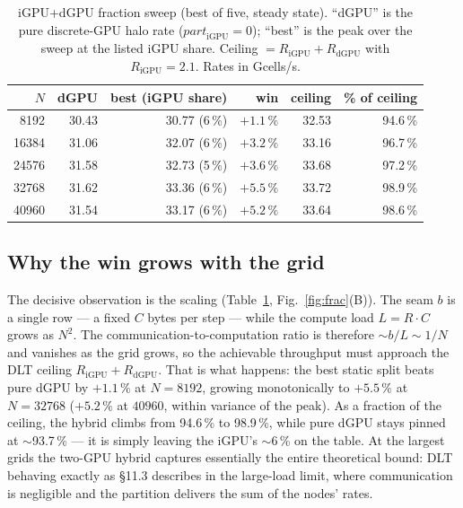 \documentclass[
	english,
	letterpaper, oneside
]{article}
\begin{document}
\begin{table}[H]
	\centering
	\caption{iGPU+dGPU fraction sweep (best of five, steady state). ``dGPU'' is the
	pure discrete-GPU halo rate ($\mathit{part}_\text{iGPU}=0$); ``best'' is the peak
	over the sweep at the listed iGPU share. Ceiling $=R_\text{iGPU}+R_\text{dGPU}$
	with $R_\text{iGPU}=2.1$. Rates in Gcells/s.}
	\label{tab:frac}
	\begin{tabular}{@{}rrrrrr@{}}
		\toprule
		$N$ & dGPU & best (iGPU share) & win & ceiling & \% of ceiling \\
		\midrule
		8192  & 30.43 & 30.77 (6\,\%) & $+1.1\,\%$ & 32.53 & 94.6\,\% \\
		16384 & 31.06 & 32.07 (6\,\%) & $+3.2\,\%$ & 33.16 & 96.7\,\% \\
		24576 & 31.58 & 32.73 (5\,\%) & $+3.6\,\%$ & 33.68 & 97.2\,\% \\
		32768 & 31.62 & 33.36 (6\,\%) & $+5.5\,\%$ & 33.72 & 98.9\,\% \\
		40960 & 31.54 & 33.17 (6\,\%) & $+5.2\,\%$ & 33.64 & 98.6\,\% \\
		\bottomrule
	\end{tabular}
\end{table}

\subsection{Why the win grows with the grid}
\label{sec:twogpu-scaling}

The decisive observation is the scaling (Table~\ref{tab:frac}, Fig.~\ref{fig:frac}(B)).
The seam $b$ is a single row --- a fixed $C$ bytes per step --- while the compute load
$L = R\cdot C$ grows as $N^2$. The communication-to-computation ratio is therefore
$\sim b/L \sim 1/N$ and vanishes as the grid grows, so the achievable throughput must
approach the DLT ceiling $R_\text{iGPU}+R_\text{dGPU}$. That is what happens: the best
static split beats pure dGPU by $+1.1\,\%$ at $N=8192$, growing monotonically to
$+5.5\,\%$ at $N=32768$ ($+5.2\,\%$ at $40960$, within variance of the peak). As a
fraction of the ceiling, the hybrid climbs from 94.6\,\% to 98.9\,\%, while pure dGPU
stays pinned at $\sim$93.7\,\% --- it is simply leaving the iGPU's $\sim$6\,\% on the
table. At the largest grids the two-GPU hybrid captures essentially the entire
theoretical bound: DLT behaving exactly as \S11.3 describes in the large-load limit,
where communication is negligible and the partition delivers the sum of the nodes'
rates.
\end{document}
